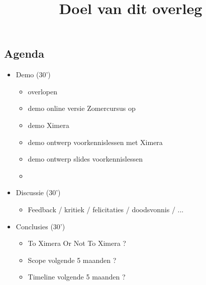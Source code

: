 \documentclass{ximera}
\title{Doel van dit overleg}
\begin{document}
\begin{abstract}
\end{abstract}
\maketitle

\subsection{Agenda}
\begin{itemize}
    \item Demo (30')
    \begin{itemize}
        \item overlopen 
        \item demo online versie Zomercursus op 
        \item demo Ximera 
        \item demo ontwerp voorkennislessen met Ximera 
        \item demo ontwerp slides voorkennislessen 
        \item {}
    \end{itemize}
    \item Discussie (30')
    \begin{itemize}
        \item Feedback / kritiek / felicitaties / doodsvonnis / ...
    \end{itemize}

    \item Conclusies  (30')
        \begin{itemize}
        \item To Ximera Or Not To Ximera ?
        \item Scope volgende 5 maanden ?
        \item Timeline volgende 5 maanden ?
    \end{itemize}
\end{itemize}
\end{document}
